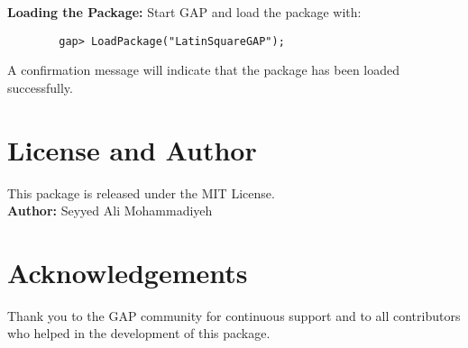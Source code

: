 \documentclass{report}
\begin{document}
	\textbf{Loading the Package:}  
	Start GAP and load the package with:
	\begin{lstlisting}
		gap> LoadPackage("LatinSquareGAP");
	\end{lstlisting}
	A confirmation message will indicate that the package has been loaded successfully.
	
	\chapter{License and Author}
	This package is released under the MIT License.\\[1mm]
	\textbf{Author:} Seyyed Ali Mohammadiyeh
	
	\chapter{Acknowledgements}
	Thank you to the GAP community for continuous support and to all contributors who helped in the development of this package.
	
\end{document}
